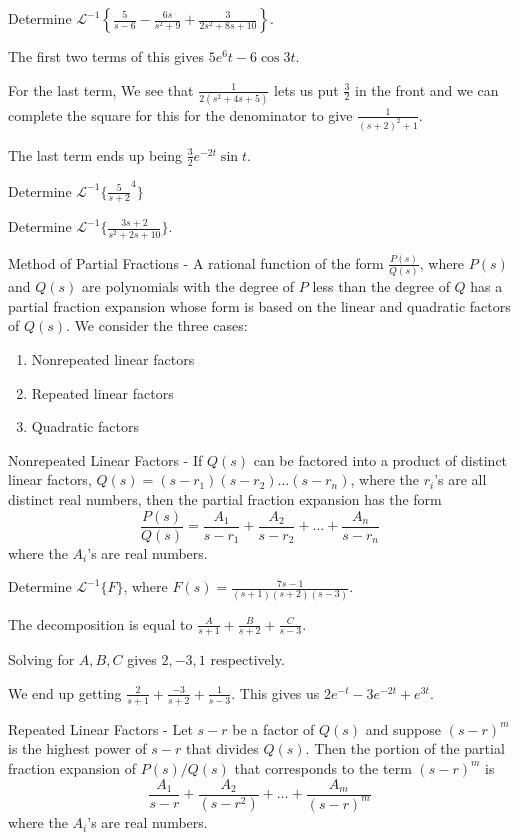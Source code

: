 \documentclass[../diffeq.tex]{subfiles}
\begin{document}
\begin{example}
    Determine $\mathcal{L}^{-1}\left\{\frac{5}{s-6}-\frac{6s}{s^2+9}+\frac{3}{2s^2+8s+10}\right\}$.

    The first two terms of this gives $5e^6t-6\cos 3t$.

    For the last term, We see that $\frac{1}{2(s^2+4s+5)}$ lets us put $\frac{3}{2}$ in the front and we can complete the square for this for the denominator to give $\frac{1}{(s+2)^2+1}$.

    The last term ends up being $\frac{3}{2}e^{-2t}\sin t$.
\end{example}

\ex Determine $\mathcal{L}^{-1}\{ \frac{5}{s+2}^4 \}$

\ex Determine $\mathcal{L}^{-1} \{ \frac{3s+2}{s^2+2s+10} \}$.

Method of Partial Fractions - A rational function of the form $\frac{P(s)}{Q(s)}$, where $P(s)$ and $Q(s)$ are polynomials with the degree of $P$ less than the degree of $Q$ has a partial fraction expansion 
whose form is based on the linear and quadratic factors of $Q(s)$. We consider the three cases:
\begin{enumerate}
    \item Nonrepeated linear factors 
    \item Repeated linear factors 
    \item Quadratic factors
\end{enumerate}

Nonrepeated Linear Factors - If $Q(s)$ can be factored into a product of distinct linear factors, $Q(s)=(s-r_1)(s-r_2)\dots(s-r_n)$, where the $r_i$'s are all distinct real numbers, then the partial fraction expansion has the form 
\[ \frac{P(s)}{Q(s)}=\frac{A_1}{s-r_1}+\frac{A_2}{s-r_2}+\dots + \frac{A_n}{s-r_n} \]
where the $A_i$'s are real numbers.

\begin{example}
    Determine $\mathcal{L}^{-1}\{F\}$, where $F(s)=\frac{7s-1}{(s+1)(s+2)(s-3)}$.

    The decomposition is equal to $\frac{A}{s+1}+\frac{B}{s+2}+\frac{C}{s-3}$.

    Solving for $A,B,C$ gives $2,-3,1$ respectively.

    We end up getting $\frac{2}{s+1}+\frac{-3}{s+2}+\frac{1}{s-3}$. This gives us $2e^{-t}-3e^{-2t}+e^{3t}$.
\end{example}

Repeated Linear Factors - Let $s-r$ be a factor of $Q(s)$ and suppose $(s-r)^m$ is the highest power of $s-r$ that divides $Q(s)$. Then the portion of the partial fraction expansion of $P(s)/Q(s)$ that corresponds to the term $(s-r)^m$ is 
\[ \frac{A_1}{s-r}+\frac{A_2}{(s-r^2)}+\dots + \frac{A_m}{(s-r)^m} \]
where the $A_i$'s are real numbers.
\end{document}
